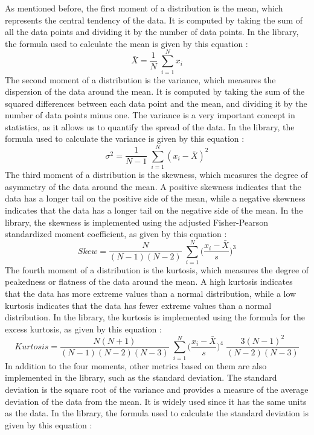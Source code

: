 \documentclass{book}
\begin{document}
As mentioned before, the first moment of a distribution is the mean, which represents the central tendency of the data. It is computed by taking the sum of all the data points and dividing it by the number of data points. In the library, the formula used to calculate the mean is given by this equation :
\begin{equation}
    \bar{X} = \frac{1}{N} \; \sum_{i=1}^{N} x_i
\end{equation}
The second moment of a distribution is the variance, which measures the dispersion of the data around the mean. It is computed by taking the sum of the squared differences between each data point and the mean, and dividing it by the number of data points minus one. The variance is a very important concept in statistics, as it allows us to quantify the spread of the data. In the library, the formula used to calculate the variance is given by this equation : 
\begin{equation}
    \sigma^2 = \frac{1}{N - 1} \; \sum_{i=1}^{N} (x_i - \bar{X})^2
\end{equation}
The third moment of a distribution is the skewness, which measures the degree of asymmetry of the data around the mean. A positive skewness indicates that the data has a longer tail on the positive side of the mean, while a negative skewness indicates that the data has a longer tail on the negative side of the mean. In the library, the skewness is implemented using the adjusted Fisher-Pearson standardized moment coefficient, as given by this equation :
\begin{equation}
    Skew = \frac{N}{(N - 1)(N - 2)} \; \sum_{i=1}^{N} \Big(\frac{x_i - \bar{X}}{s}\Big)^3
\end{equation}
The fourth moment of a distribution is the kurtosis, which measures the degree of peakedness or flatness of the data around the mean. A high kurtosis indicates that the data has more extreme values than a normal distribution, while a low kurtosis indicates that the data has fewer extreme values than a normal distribution. In the library, the kurtosis is implemented using the formula for the excess kurtosis, as given by this equation : 
\begin{equation}
    Kurtosis = \frac{N(N + 1)}{(N - 1)(N - 2)(N - 3)} \; \sum_{i=1}^{N} \Big(\frac{x_i - \bar{X}}{s}\Big)^4 \; \frac{3(N - 1)^2}{(N - 2)(N - 3)}
\end{equation}
In addition to the four moments, other metrics based on them are also implemented in the library, such as the standard deviation. The standard deviation is the square root of the variance and provides a measure of the average deviation of the data from the mean. It is widely used since it has the same units as the data. In the library, the formula used to calculate the standard deviation is given by this equation : 
\end{document}

